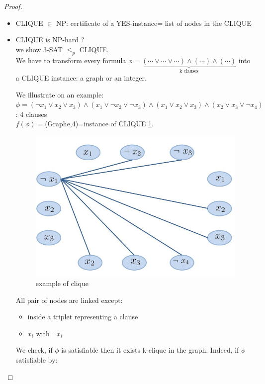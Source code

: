 \begin{proof}
\begin{itemize}
\item CLIQUE $\in$ NP: certificate of a YES-instance= list of nodes in the CLIQUE
\item CLIQUE is NP-hard ? \\
we show 3-SAT $\leq_p$ CLIQUE.  \\
We have to transform every formula $\phi=\underbrace{( \cdots \vee \cdots \vee \cdots) \wedge ( \cdots ) \wedge ( \cdots)}_{\text{k clauses}}$ into a CLIQUE instance: a graph or an integer. 

We illustrate on an example: \\ $\phi=(\neg x_1 \vee x_2 \vee x_3) \wedge (x_1 \vee \neg x_2 \vee \neg x_3) \wedge (x_1 \vee x_2 \vee x_3) \wedge (x_2 \vee x_3 \vee \neg x_4)$: 4 clauses \\ $f(\phi)=$(Graphe,4)=instance of CLIQUE \ref{c12:clique1}. 

\begin{figure}[h!]
\centering
\includegraphics[scale=0.5]{images/fig_3.jpg}
\caption{example of clique}
\label{c12:clique1}
\end{figure}

All pair of nodes are linked except: 
\begin{itemize}
\item inside a triplet representing a clause
\item $x_i$ with $\neg x_i$
\end{itemize}

We check, if $\phi$ is satisfiable then it exists k-clique in the graph. Indeed, if $\phi$ satisfiable by: 


\end{itemize}
\end{proof}
